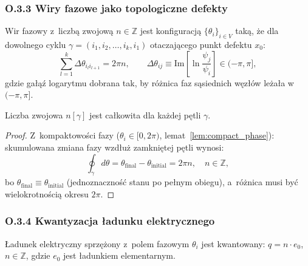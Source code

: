 \subsubsection*{O.3.3 Wiry fazowe jako topologiczne defekty}

\begin{definicja}
\label{def:vortex}
Wir fazowy z~liczbą zwojową $n \in \mathbb{Z}$ jest konfiguracją
$\{\theta_i\}_{i\in V}$ taką, że dla dowolnego cyklu
$\gamma = (i_1, i_2, \ldots, i_k, i_1)$ otaczającego
punkt defektu $x_0$:
\begin{equation}
  \sum_{l=1}^k \Delta\theta_{i_l i_{l+1}} = 2\pi n,
  \qquad
  \Delta\theta_{ij} \equiv \mathrm{Im}\!\left[\ln\frac{\psi_j}{\psi_i}\right]
  \in (-\pi, \pi],
  \label{eq:winding_def}
\end{equation}
gdzie gałąź logarytmu dobrana tak, by różnica faz sąsiednich
węzłów leżała w~$(-\pi,\pi]$.
\end{definicja}

\begin{twierdzenie}
\label{thm:winding_quant}
Liczba zwojowa $n[\gamma]$ jest całkowita dla każdej pętli $\gamma$.
\end{twierdzenie}

\begin{proof}
Z~kompaktowości fazy ($\theta_i \in [0,2\pi)$, lemat~\ref{lem:compact_phase}):
skumulowana zmiana fazy wzdłuż zamkniętej pętli wynosi:
\begin{equation}
  \oint_\gamma d\theta
  = \theta_\mathrm{final} - \theta_\mathrm{initial}
  = 2\pi n, \quad n \in \mathbb{Z},
\end{equation}
bo $\theta_\mathrm{final} \equiv \theta_\mathrm{initial}$
(jednoznaczność stanu po pełnym obiegu), a~różnica musi być
wielokrotnością okresu $2\pi$.
\end{proof}

\subsubsection*{O.3.4 Kwantyzacja ładunku elektrycznego}

\begin{twierdzenie}
\label{thm:charge_quantization}
Ładunek elektryczny sprzężony z~polem fazowym $\theta_i$ jest
kwantowany: $q = n \cdot e_0$, $n \in \mathbb{Z}$, gdzie
$e_0$ jest ładunkiem elementarnym.
\end{twierdzenie}

